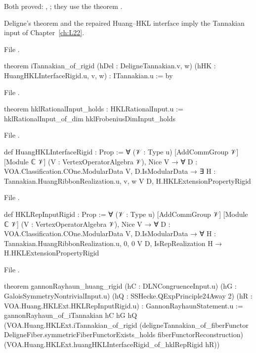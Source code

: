 \begin{status}
Both proved: , ; they use the theorem .
\end{status}

\begin{theorem}\label{l21:thm:itannakian}
Deligne's theorem and the repaired Huang--HKL interface imply the Tannakian input of Chapter~\ref{ch:L22}.
\end{theorem}
\noindent File .
\begin{leancode}
theorem iTannakian_of_rigid (hDel : DeligneTannakian.{v, w})
    (hHK : HuangHKLInterfaceRigid.{u, v, w}) : ITannakian.{u} := by
\end{leancode}
\noindent File .
\begin{leancode}
theorem hklRationalInput_holds : HKLRationalInput.{u} :=
  hklRationalInput_of_dim hklFrobeniusDimInput_holds
\end{leancode}
\noindent File .
\begin{leancode}
def HuangHKLInterfaceRigid : Prop :=
  ∀ (𝒱 : Type u) [AddCommGroup 𝒱] [Module ℂ 𝒱] (V : VertexOperatorAlgebra 𝒱), Nice V →
    ∀ D : VOA.Classification.COne.ModularData V, D.IsModularData →
      ∃ H : Tannakian.HuangRibbonRealization.{u, v, w} V D, H.HKLExtensionPropertyRigid
\end{leancode}
\noindent File .
\begin{leancode}
def HKLRepInputRigid : Prop :=
  ∀ (𝒱 : Type u) [AddCommGroup 𝒱] [Module ℂ 𝒱] (V : VertexOperatorAlgebra 𝒱), Nice V →
    ∀ D : VOA.Classification.COne.ModularData V, D.IsModularData →
      ∀ H : Tannakian.HuangRibbonRealization.{u, 0, 0} V D, IsRepRealization H →
        H.HKLExtensionPropertyRigid
\end{leancode}
\noindent File .
\begin{leancode}
theorem gannonRayhaun_huang_rigid
    (hC : DLNCongruenceInput.{u}) (hG : GaloisSymmetryNontrivialInput.{u})
    (hQ : SSHecke.QExpPrinciple24Away 2)
    (hR : VOA.Huang.HKLExt.HKLRepInputRigid.{u}) :
    GannonRayhaunStatement.{u} :=
  gannonRayhaun_of_iTannakian hC hG hQ
    (VOA.Huang.HKLExt.iTannakian_of_rigid
      (deligneTannakian_of_fiberFunctor DeligneFiber.symmetricFiberFunctorExists_holds
        fiberFunctorReconstruction)
      (VOA.Huang.HKLExt.huangHKLInterfaceRigid_of_hklRepRigid hR))
\end{leancode}

